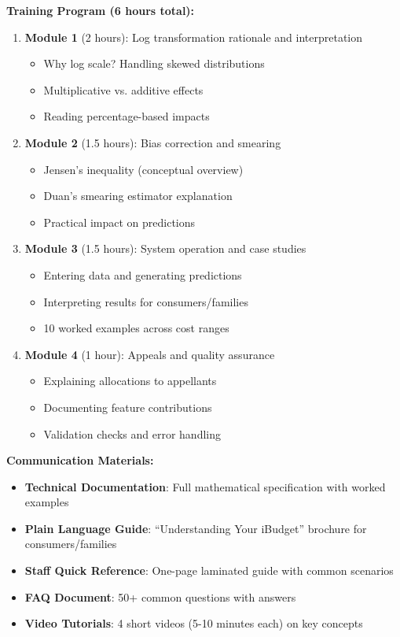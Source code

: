 \textbf{Training Program (6 hours total):}
\begin{enumerate}
    \item \textbf{Module 1} (2 hours): Log transformation rationale and interpretation
    \begin{itemize}
        \item Why log scale? Handling skewed distributions
        \item Multiplicative vs. additive effects
        \item Reading percentage-based impacts
    \end{itemize}
    
    \item \textbf{Module 2} (1.5 hours): Bias correction and smearing
    \begin{itemize}
        \item Jensen's inequality (conceptual overview)
        \item Duan's smearing estimator explanation
        \item Practical impact on predictions
    \end{itemize}
    
    \item \textbf{Module 3} (1.5 hours): System operation and case studies
    \begin{itemize}
        \item Entering data and generating predictions
        \item Interpreting results for consumers/families
        \item 10 worked examples across cost ranges
    \end{itemize}
    
    \item \textbf{Module 4} (1 hour): Appeals and quality assurance
    \begin{itemize}
        \item Explaining allocations to appellants
        \item Documenting feature contributions
        \item Validation checks and error handling
    \end{itemize}
\end{enumerate}

\textbf{Communication Materials:}
\begin{itemize}
    \item \textbf{Technical Documentation}: Full mathematical specification with worked examples
    \item \textbf{Plain Language Guide}: ``Understanding Your iBudget'' brochure for consumers/families
    \item \textbf{Staff Quick Reference}: One-page laminated guide with common scenarios
    \item \textbf{FAQ Document}: 50+ common questions with answers
    \item \textbf{Video Tutorials}: 4 short videos (5-10 minutes each) on key concepts
\end{itemize}

